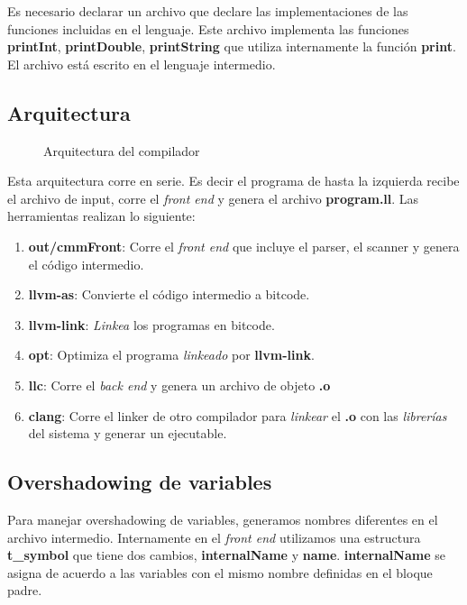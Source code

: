 \documentclass[11pt]{article}
\begin{document}
Es necesario declarar un archivo que declare las implementaciones de las funciones incluidas en el lenguaje. Este archivo implementa las funciones \textbf{printInt}, \textbf{printDouble}, \textbf{printString} que utiliza internamente la función \textbf{print}. El archivo está escrito en el lenguaje intermedio.

\subsection{Arquitectura}

\begin{figure}[H]
    \centering
    \caption{Arquitectura del compilador}
    \label{fig:arch}
\end{figure}

Esta arquitectura corre en serie. Es decir el programa de hasta la izquierda recibe el archivo de input, corre el \textit{front end} y genera el archivo \textbf{program.ll}. Las herramientas realizan lo siguiente:

\begin{enumerate}
	\item \textbf{out/cmmFront}: Corre el \textit{front end} que incluye el parser, el scanner y genera el código intermedio.
	\item \textbf{llvm-as}: Convierte el código intermedio a bitcode.
	\item \textbf{llvm-link}: \textit{Linkea} los programas en bitcode.
	\item \textbf{opt}: Optimiza el programa \textit{linkeado} por \textbf{llvm-link}.
	\item \textbf{llc}: Corre el \textit{back end} y genera un archivo de objeto \textbf{.o}
	\item \textbf{clang}: Corre el linker de otro compilador para \textit{linkear} el \textbf{.o} con las \textit{librerías} del sistema y generar un ejecutable.
\end{enumerate}

\subsection{Overshadowing de variables}

Para manejar overshadowing de variables, generamos nombres diferentes en el archivo intermedio. Internamente en el \textit{front end} utilizamos una estructura \textbf{t\_symbol} que tiene dos cambios, \textbf{internalName} y \textbf{name}. \textbf{internalName} se asigna de acuerdo a las variables con el mismo nombre definidas en el bloque padre.
\end{document}
